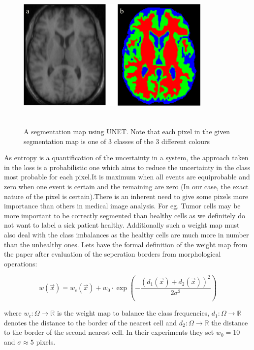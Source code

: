 \documentclass[19pt]{article}
\begin{document}
\begin{center}
    \begin{figure}[!h!t!b]
        \centerline{\includegraphics[width=95mm,height=75mm]{images/segmapunet.png}}
        \caption{A segmentation map using UNET. Note that each pixel in the given segmentation map is one of 3 classes of the 3 different colours}
        \label{fig:7}
    \end{figure}
\end{center}

As entropy is a quantification of the uncertainty in a system, the approach taken in the loss is a probabilistic one which aims to reduce the uncertainty in the class most probable for each pixel.It is maximum when all events are equiprobable and zero when one event is certain and the remaining are zero (In our case, the exact nature of the pixel is certain).There is an inherent need to give some pixels more importance than others in medical image analysis. For eg. Tumor cells may be more important to be correctly segmented than healthy cells as we definitely do not want to label a sick patient healthy. Additionally such a weight map must also deal with the class imbalances as the healthy cells are much more in number than the unhealthy ones. Lets have the formal definition of the weight map from the paper after evaluation of the seperation borders from morphological operations:

\begin{equation} 
    \label{weightmap}
    w(\vec{x}) = w_c(\vec{x}) + w_0 \cdot \exp\left( - \frac{(d_1(\vec{x}) + d_2(\vec{x}))^2}{2\sigma^2}\right ) 
\end{equation}

 where $w_c:\Omega \rightarrow \mathbb{R}$ is the weight map to balance the class frequencies, $d_1:\Omega \rightarrow \mathbb{R}$ denotes the distance to the border of the nearest cell and $d_2:\Omega \rightarrow \mathbb{R}$ the distance to the border of the second nearest cell. In their experiments they set $w_0 = 10$ and $ \sigma \approx 5 $ pixels.
\end{document}
